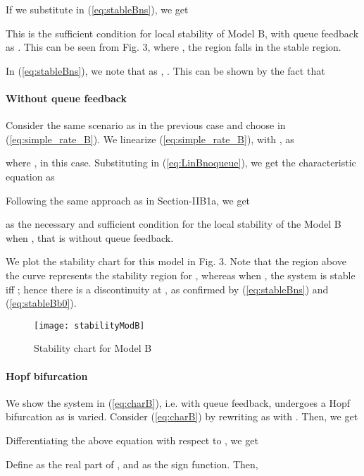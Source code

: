 \documentclass[conference]{IEEEtran}
\begin{document}
If we substitute  in (\ref{eq:stableBns}), we get 


This is the sufficient condition for local stability of Model B, with queue feedback as 
. This can be seen from Fig. 3, where , the region  falls in the stable region. 

In (\ref{eq:stableBns}), we note that as , . This 
can be shown by the fact that 


\paragraph{Without queue feedback}
Consider the same scenario as in the previous case and choose  in (\ref{eq:simple_rate_B}).
We linearize (\ref{eq:simple_rate_B}), with , as

where , in this case. Substituting  in (\ref{eq:LinBnoqueue}), we get the characteristic equation as


Following the same approach as in Section-IIB1a, we get

as the necessary and sufficient condition for the local stability of the Model B when , 
that is without queue feedback. 

We plot the stability chart for this model in Fig. 3. Note that the region above the curve represents
the stability region for , whereas when , the system is stable iff ; hence there is a discontinuity at , as confirmed by (\ref{eq:stableBns}) and (\ref{eq:stableBb0}).

\begin{figure}
\label{stableB}
\centering
{}
\texttt{[image: stabilityModB]}
\caption{ Stability chart for Model B}
\end{figure}

\paragraph{Hopf bifurcation}

We show the system in (\ref{eq:charB}), i.e. with queue feedback, undergoes a Hopf bifurcation as  is varied. Consider (\ref{eq:charB}) by rewriting  as  with . Then, we get


Differentiating the above equation with respect to , we get


Define  as the real part of , and  as the sign function. Then,
\end{document}

